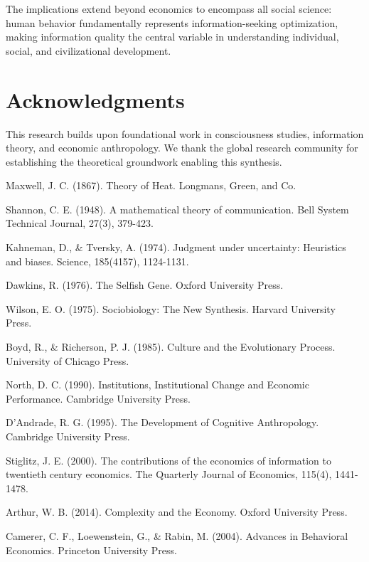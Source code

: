 \documentclass[12pt,a4paper]{article}
\begin{document}
The implications extend beyond economics to encompass all social science: human behavior fundamentally represents information-seeking optimization, making information quality the central variable in understanding individual, social, and civilizational development.

\section*{Acknowledgments}

This research builds upon foundational work in consciousness studies, information theory, and economic anthropology. We thank the global research community for establishing the theoretical groundwork enabling this synthesis.


\begin{thebibliography}{99}

Maxwell, J. C. (1867). Theory of Heat. Longmans, Green, and Co.

Shannon, C. E. (1948). A mathematical theory of communication. Bell System Technical Journal, 27(3), 379-423.

Kahneman, D., \& Tversky, A. (1974). Judgment under uncertainty: Heuristics and biases. Science, 185(4157), 1124-1131.

Dawkins, R. (1976). The Selfish Gene. Oxford University Press.

Wilson, E. O. (1975). Sociobiology: The New Synthesis. Harvard University Press.

Boyd, R., \& Richerson, P. J. (1985). Culture and the Evolutionary Process. University of Chicago Press.

North, D. C. (1990). Institutions, Institutional Change and Economic Performance. Cambridge University Press.

D'Andrade, R. G. (1995). The Development of Cognitive Anthropology. Cambridge University Press.

Stiglitz, J. E. (2000). The contributions of the economics of information to twentieth century economics. The Quarterly Journal of Economics, 115(4), 1441-1478.

Arthur, W. B. (2014). Complexity and the Economy. Oxford University Press.

Camerer, C. F., Loewenstein, G., \& Rabin, M. (2004). Advances in Behavioral Economics. Princeton University Press.


\end{thebibliography}
\end{document}
